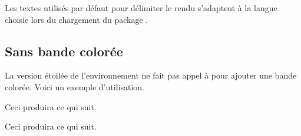 \begin{bdocrem}
    Les textes utilisés par défaut  pour délimiter le rendu s'adaptent à la langue choisie lors du chargement du package .
\end{bdocrem}




\subsection{Sans bande colorée}

\begin{bdocexa}
	La version étoilée de l'environnement  ne fait pas appel à  pour ajouter une bande colorée.
	Voici un exemple d'utilisation.


	Ceci produira ce qui suit.

	\medskip
	
	
\end{bdocexa}




\begin{bdocexa}
	\leavevmode


	Ceci produira ce qui suit.

	\medskip
	
	
\end{bdocexa}




%
%    
%    
%    
%    
%    
%    
%    
%    
%    	
%    
%    
%    
%    
%
%
%
%



